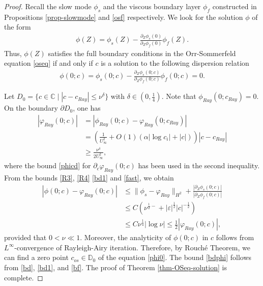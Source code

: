 \documentclass[reqno,11pt]{amsart}
\numberwithin{equation}{section}
\numberwithin{equation}{section}
\theoremstyle{plain}
\begin{document}
\begin{proof}
	Recall the slow mode $\phi_{s}$ and the viscous boundary layer $\phi_{f}$ constructed in Propositions \ref{prop-slowmode} and \ref{osf} respectively.	We look for the solution $\phi$ of the form
	\begin{align}
		\phi(Z)=\phi_{s}(Z)-\frac{\partial_Z\phi_{s}(0)}{\partial_Z\phi_f(0)}\phi_{f}(Z).\nonumber
	\end{align}
Thus, $\phi(Z)$ satisfies the full boundary conditions in the Orr-Sommerfeld equation \eqref{oseq} if and only if $c$ is a solution to the following dispersion relation
\begin{align}
	\phi(0;c)=\phi_s(0;c)-\frac{\partial_Z\phi_{s}(0;c)}{\partial_Z\phi_f(0;c)}\phi_{f}(0;c)=0.\label{phi0}
\end{align}


	Let $D_0=\{c\in \mathbb{C}\mid |c-c_{Ray}|\leq \nu^{\delta}\}$ with $\delta\in (0,\frac14)$. Note that $\phi_{Ray}(0;c_{Ray})=0$. On the boundary $\partial D_{0}$, one has	
	\begin{align}
		|\varphi_{Ray}(0;c)|&=|\phi_{Ray}(0;c)-\varphi_{Ray}(0;c_{Ray})|\nonumber\\
		&=\left(\frac{1}{U_\infty^2}+O(1)(\alpha|\log c_i|+|c|)\right)|c-c_{Ray}|\nonumber\\
		&\geq \frac{\nu^{\delta}}{2U_{\infty}^2},\nonumber
	\end{align}
where the bound \eqref{phicd} for $\partial_c\varphi_{Ray}(0;c)$ has been used in the second inequality. From the bounds \eqref{R3}, \eqref{R4} \eqref{bd1} and \eqref{fast}, we obtain
$$
\begin{aligned}
|\phi(0;c)-\varphi_{Ray}(0;c)|&\leq \|\phi_s-\varphi_{Ray}\|_{H^2}+\frac{|\partial_Z\phi_s(0;c)|}{|\partial_Z\phi_{f}(0;c)|}\\
&\leq C\left(\nu^{\frac12-}+|\varepsilon|^{\frac12}|c|^{-\frac12}\right)\nonumber\\
&\leq C\nu^{\frac14}|\log\nu|\leq \frac12|\varphi_{Ray}(0;c)|,
\end{aligned}
$$
provided that $0<\nu\ll 1$. Moreover, the analyticity of $\phi(0;c)$ in $c$ follows from $L^\infty$-convergence of Rayleigh-Airy iteration. Therefore, by Rouch\'e Theorem, we can find a zero point $c_{os}\in \mathbb{D}_0$ of the equation \eqref{phi0}. The bound \eqref{bdphi} follows from  \eqref{bd}, \eqref{bd1}, and \eqref{bf}. The proof of Theorem \ref{thm-OSeq-solution} is complete.
\end{proof}
\end{document}
